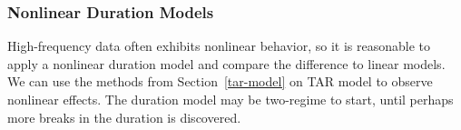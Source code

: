 

\subsubsection{Nonlinear Duration Models}
High-frequency data often exhibits nonlinear behavior, so it is reasonable to apply a nonlinear duration model and compare the difference to linear models.  We can use the methods from Section~\ref{tar-model} on TAR model to observe nonlinear effects. The duration model may be two-regime to start, until perhaps more breaks in the duration \fts{} is discovered.
